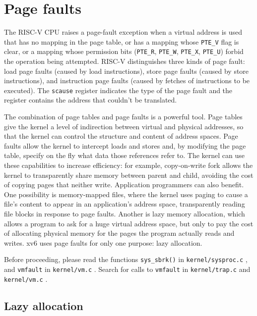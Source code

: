 \chapter{Page faults}
\label{CH:PGFAULTS}

The RISC-V CPU raises a page-fault exception
when a virtual address is used that has no mapping
in the page table, or has a mapping whose \lstinline{PTE_V}
flag is clear, or a mapping whose permission bits
(\lstinline{PTE_R},
\lstinline{PTE_W},
\lstinline{PTE_X},
\lstinline{PTE_U})
forbid the operation being attempted.
RISC-V distinguishes three
kinds of page fault: load page faults (caused by load instructions),
store page faults (caused by store instructions),
and instruction
page faults (caused by fetches of instructions to be executed).  The
\lstinline{scause} register indicates the type of the
page fault and the  register contains the address
that couldn't be translated.

The combination of page tables and page faults is a powerful tool.
Page tables give the kernel a level of indirection between virtual and
physical addresses, so that the kernel can control the structure and
content of address spaces. Page faults allow the kernel to intercept
loads and stores and, by modifying the page table, specify on the fly
what data those references refer to. The kernel can use these
capabilities to increase efficiency: for example, copy-on-write fork
allows the kernel to transparently share memory between parent and
child, avoiding the cost of copying pages that neither write.
Application programmers can also benefit. One possibility is
memory-mapped files, where the kernel uses paging to cause a file's
content to appear in an application's address space, transparently
reading file blocks in response to page faults. Another is lazy memory
allocation, which allows a program to ask for a huge virtual
address space, but only to pay the cost of allocating physical memory
for the pages the program actually reads and writes. xv6 uses page
faults for only one purpose: lazy allocation.

Before proceeding, please read the functions {\tt sys\_sbrk()} in
  \lstinline{kernel/sysproc.c} , and {\tt vmfault} in \lstinline{kernel/vm.c} .
Search for calls to {\tt vmfault} in \lstinline{kernel/trap.c}  and \lstinline{kernel/vm.c} .

\section{Lazy allocation}
\label{sec:lazy}

